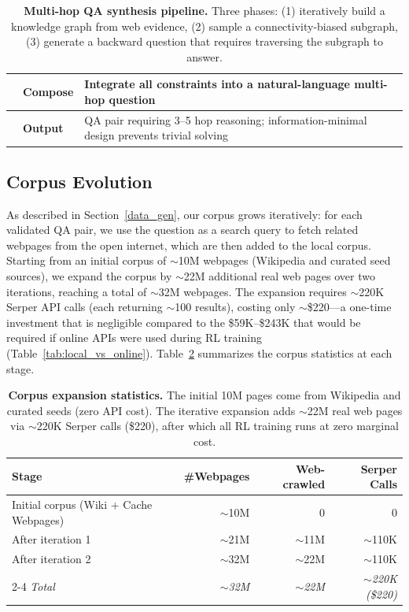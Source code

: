 \documentclass{article} %
\theoremstyle{plain}
\theoremstyle{definition}
\theoremstyle{remark}
\begin{document}
\begin{table}[H]
\begin{tabular}{@{} c l p{9.8cm} @{}}
        & \textbf{Compose} & Integrate all constraints into a natural-language multi-hop question \\
        \midrule
        & \textbf{Output} & QA pair requiring 3--5 hop reasoning; information-minimal design prevents trivial solving \\
        \bottomrule
    \end{tabular}
    \caption{\textbf{Multi-hop QA synthesis pipeline.} Three phases: (1) iteratively build a knowledge graph from web evidence, (2) sample a connectivity-biased subgraph, (3) generate a backward question that requires traversing the subgraph to answer.}
    \label{tab:multihop_pipeline}
\end{table}

\subsection{Corpus Evolution}

As described in Section~\ref{data_gen}, our corpus grows iteratively: for each validated QA pair, we use the question as a search query to fetch related webpages from the open internet, which are then added to the local corpus. Starting from an initial corpus of $\sim$10M webpages (Wikipedia and curated seed sources), we expand the corpus by $\sim$22M additional real web pages over two iterations, reaching a total of $\sim$32M webpages. The expansion requires $\sim$220K Serper API calls (each returning $\sim$100 results), costing only $\sim$\$220---a one-time investment that is negligible compared to the \$59K--\$243K that would be required if online APIs were used during RL training (Table~\ref{tab:local_vs_online}). Table~\ref{tab:corpus_stats} summarizes the corpus statistics at each stage.

\begin{table}[H]
    \centering
    \small
    \setlength{\tabcolsep}{6pt}
    \renewcommand{\arraystretch}{1.1}
    \begin{tabular}{lrrr}
        \toprule
        \textbf{Stage} & \textbf{\#Webpages} & \textbf{Web-crawled} & \textbf{Serper Calls} \\
        \midrule
        Initial corpus (Wiki + Cache Webpages) & $\sim$10M & 0 & 0 \\
        After iteration 1 & $\sim$21M & $\sim$11M & $\sim$110K \\
        After iteration 2 & $\sim$32M & $\sim$22M & $\sim$110K \\
        \cmidrule{2-4}
        \textit{Total} & \textit{$\sim$32M} & \textit{$\sim$22M} & \textit{$\sim$220K (\$220)} \\
        \bottomrule
    \end{tabular}
    \caption{\textbf{Corpus expansion statistics.} The initial 10M pages come from Wikipedia and curated seeds (zero API cost). The iterative expansion adds $\sim$22M real web pages via $\sim$220K Serper calls (\$220), after which all RL training runs at zero marginal cost.}
    \label{tab:corpus_stats}
\end{table}
\end{document}
